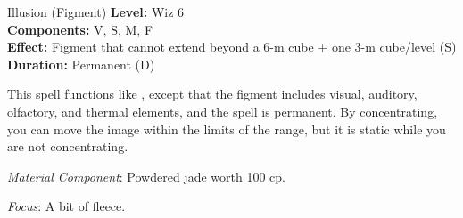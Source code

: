 {Illusion (Figment)}
{
	\textbf{Level:}
	Wiz 6\\
	\textbf{Components:}
	V, S, M, F\\
	\textbf{Effect:}
	Figment that cannot extend beyond a 6-m cube + one 3-m cube/level (S)\\
	\textbf{Duration:}
	Permanent (D)\\
}
{
	This spell functions like , except that the figment includes visual, auditory, olfactory, and thermal elements, and the spell is permanent. By concentrating, you can move the image within the limits of the range, but it is static while you are not concentrating.

	\textit{Material Component}:
	 Powdered jade worth 100 cp.

	\textit{Focus}:
	A bit of fleece.

}
